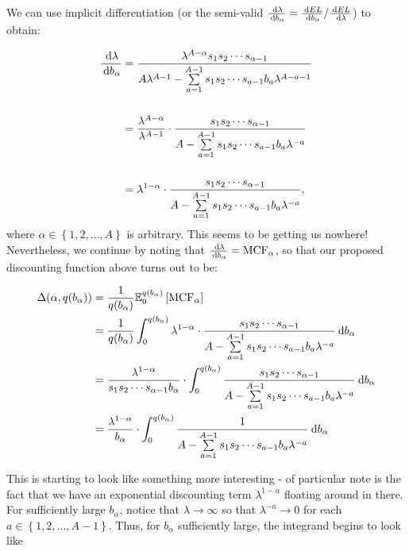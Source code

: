 We can use implicit differentiation (or the semi-valid $\frac{\:\textrm{d}\lambda}{ \:\textrm{d}b_\alpha} = \frac{\:\textrm{d}EL}{\:\textrm{d}b_\alpha}/
\frac{\:\textrm{d}EL}{\:\textrm{d}\lambda}$) to obtain:

\begin{align*}
    \frac{\:\textrm{d}\lambda}{\:\textrm{d}b_{\alpha}} &= \frac{\lambda^{A-\alpha}s_1s_2\cdots s_{\alpha-1}}{A\lambda^{A-1} -
    \sum\limits_{a = 1}^{A-1}s_1s_2\cdots s_{a-1}b_a\lambda^{A-a-1}} \\\\
    &= \frac{\lambda^{A-\alpha}}{\lambda^{A-1}} \cdot \frac{s_1s_2\cdots s_{\alpha-1}}{A - \sum\limits_{a = 1}^{A-1}s_1s_2\cdots s_{a-1}b_a\lambda^{-a}}\\\\
    &= \lambda^{1-\alpha} \cdot \frac{s_1s_2\cdots s_{\alpha-1}}{A - \sum\limits_{a = 1}^{A-1}s_1s_2\cdots s_{a-1}b_a\lambda^{-a}},
\end{align*}
where $\alpha\in\left\{ 1, 2, \ldots, A \right\}$ is arbitrary. This seems to be getting us nowhere! Nevertheless, we continue by
noting that $\frac{\:\textrm{d}\lambda}{\:\textrm{d}b_\alpha} = \text{MCF}_\alpha$, so that our proposed discounting function above turns out to be:

\begin{align*}
    \Delta(\alpha, q(b_\alpha)) &=\frac{1}{q(b_{\alpha})} \mathbb{E}_0^{q(b_\alpha)}\left[ \text{MCF}_\alpha\right] \\
    &= \frac{1}{q(b_{\alpha})} \int_0^{q(b_\alpha)} \lambda^{1-\alpha} \cdot \frac{s_1s_2\cdots s_{\alpha-1}}{A - \sum\limits_{a = 1}^{A-1}s_1s_2\cdots s_{a-1}b_a\lambda^{-a}} \:\textrm{d}b_\alpha \\
    &= \frac{\lambda^{1-\alpha}}{s_1s_2\cdots s_{\alpha-1}b_{\alpha}}\cdot\int_0^{q(b_\alpha)} \frac{s_1s_2\cdots s_{\alpha-1}}{A - \sum\limits_{a = 1}^{A-1}s_1s_2\cdots s_{a-1}b_a\lambda^{-a}} \:\textrm{d}b_\alpha \\
    &= \frac{\lambda^{1-\alpha}}{b_{\alpha}}\cdot\int_0^{q(b_\alpha)} \frac{1}{A - \sum\limits_{a = 1}^{A-1}s_1s_2\cdots s_{a-1}b_a\lambda^{-a}} \:\textrm{d}b_\alpha \\
\end{align*}

This is starting to look like something more interesting - of particular note is the fact that we have an exponential discounting term $\lambda^{1-\alpha}$
floating around in there. For sufficiently large $b_{\alpha}$, notice that $\lambda\to\infty$ so that $\lambda^{-a}\to 0$ for each 
$a\in\left\{ 1, 2, \ldots, A-1 \right\}$. Thus, for $b_\alpha$ sufficiently large, the integrand begins to look like

